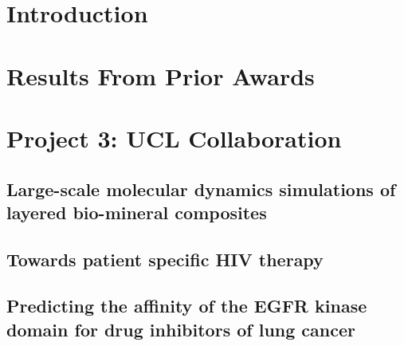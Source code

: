 \documentclass[letterpaper,10pt]{article}
\begin{document}
\title{}
\author{}
\maketitle

\section{Introduction}



\section{Results From Prior Awards}



\section{Project 3: UCL Collaboration}

\subsection{Large-scale molecular dynamics simulations of layered bio-mineral composites}


\subsection{Towards patient specific HIV therapy}


\subsection{Predicting the affinity of the EGFR kinase domain for drug inhibitors of lung cancer}



\end{document}

